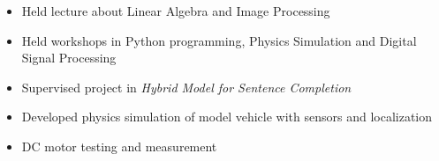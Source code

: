 \documentclass[10pt,a4paper]{source/altacv}
\begin{document}
\tagline{}

%

\begin{fullwidth}
\makecvheader 
\end{fullwidth}

%





\begin{itemize}
    \item   \small{Held lecture about Linear Algebra and Image Processing}
    \item   \small{Held workshops in Python programming, Physics Simulation and Digital Signal Processing}
    \item   \small{Supervised project in \textit{Hybrid Model for Sentence Completion}}
\end{itemize}

\medskip
\divider



\begin{itemize}
    \item   \small{Developed physics simulation of model vehicle with sensors and localization}
    \item   \small{DC motor testing and measurement} \\
    \smallskip
     
\end{itemize}

\end{document}
